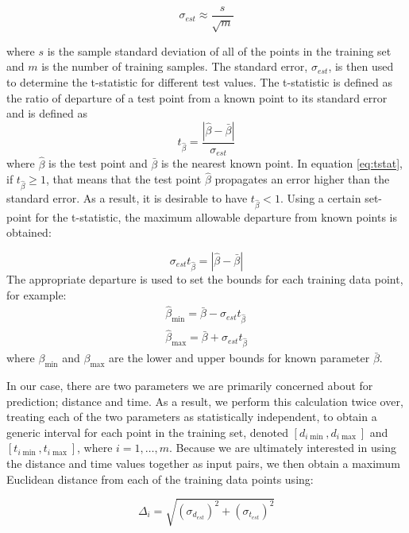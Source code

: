\documentclass[letterpaper, 10 pt, conference]{ieeeconf}  %
\begin{document}
\begin{equation} \label{eq:stderr}
    \sigma_{est} \approx \frac{s}{\sqrt{m}}
\end{equation}

where $s$ is the sample standard deviation of all of the points in the training set and $m$ is the number of training samples. The standard error, $\sigma_{est}$, is then used to determine the t-statistic for different test values. The t-statistic is defined as the ratio of departure of a test point from a known point to its standard error and is defined as
\begin{equation} \label{eq:tstat}
t_{\hat{\beta}} = \frac{|\hat{\beta}-\bar{\beta}|}{\sigma_{est}}    
\end{equation}
where $\hat{\beta}$ is the test point and $\bar{\beta}$ is the nearest known point. In equation \eqref{eq:tstat}, if $t_{\hat{\beta}} \geq 1$, that means that the test point $\hat{\beta}$ propagates an error higher than the standard error. As a result, it is desirable to have $t_{\hat{\beta}} < 1$. Using a certain set-point for the t-statistic, the maximum allowable departure from known points is obtained:

\begin{equation}
    \sigma_{est}t_{\hat{\beta}} = |\hat{\beta}-\bar{\beta}|
\end{equation}
The appropriate departure is used to set the bounds for each training data point, for example:
\begin{align}
    \hat{\beta}_{\min} = \bar{\beta} - \sigma_{est}t_{\hat{\beta}} \nonumber \\
    \hat{\beta}_{\max} = \bar{\beta} + \sigma_{est}t_{\hat{\beta}}
\end{align}
where $\beta_{\min}$ and $\beta_{\max}$ are the lower and upper bounds for known parameter $\bar{\beta}$.

In our case, there are two parameters we are primarily concerned about for prediction; distance and time. As a result, we perform this calculation twice over, treating each of the two parameters as statistically independent, to obtain a generic interval for each point in the training set, denoted $[d_{i\min},d_{i\max}]$ and $[t_{i\min},t_{i\max}]$, where $i=1,\ldots,m$. Because we are ultimately interested in using the distance and time values together as input pairs, we then obtain a maximum Euclidean distance from each of the training data points using:

\begin{equation}
    \Delta_i = \sqrt{(\sigma_{d_{est}})^2+(\sigma_{t_{est}})^2}
\end{equation}
\end{document}
